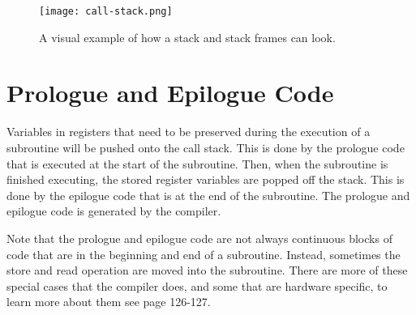 \begin{figure}[!htb]
	\centering
	\texttt{[image: call-stack.png]}
	\caption{A visual example of how a stack and stack frames can look.}
	\label{fig:callstack}
\end{figure}





\section{Prologue and Epilogue Code}
 


Variables in registers that need to be preserved during the execution of a subroutine will be pushed onto the call stack.
This is done by the prologue code that is executed at the start of the subroutine.
Then, when the subroutine is finished executing, the stored register variables are popped off the stack.
This is done by the epilogue code that is at the end of the subroutine.
The prologue and epilogue code is generated by the compiler.


Note that the prologue and epilogue code are not always continuous blocks of code that are in the beginning and end of a subroutine.
Instead, sometimes the store and read operation are moved into the subroutine.
There are more of these special cases that the compiler does, and some that are hardware specific, to learn more about them see \cite{dwarf} page 126-127.



